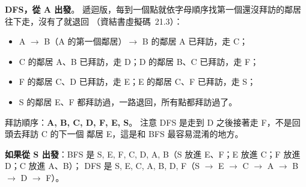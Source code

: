 \begin{pastsoln}
\textbf{DFS，從 A 出發}。 遞迴版，每到一個點就依字母順序找第一個還沒拜訪的鄰居往下走，沒有了就退回
（資結書虛擬碼~21.3）：
\begin{itemize}
\item A $\to$ B（A 的第一個鄰居）$\to$ B 的鄰居 A 已拜訪，走 C；
\item C 的鄰居 A、B 已拜訪，走 D；D 的鄰居 B、C 已拜訪，走 F；
\item F 的鄰居 C、D 已拜訪，走 E；E 的鄰居 C、F 已拜訪，走 S；
\item S 的鄰居 E、F 都拜訪過，一路退回，所有點都拜訪過了。
\end{itemize}
拜訪順序：\textbf{A, B, C, D, F, E, S}。 注意 DFS 是走到 D 之後接著走 F，不是回頭去拜訪 C 的下一個
鄰居 E，這是和 BFS 最容易混淆的地方。

\textbf{如果從 S 出發}：BFS 是 S, E, F, C, D, A, B（S 放進 E、F；E 放進 C；F 放進 D；C 放進 A、B）；
DFS 是 S, E, C, A, B, D, F（S $\to$ E $\to$ C $\to$ A $\to$ B $\to$ D $\to$ F）。
\end{pastsoln}
